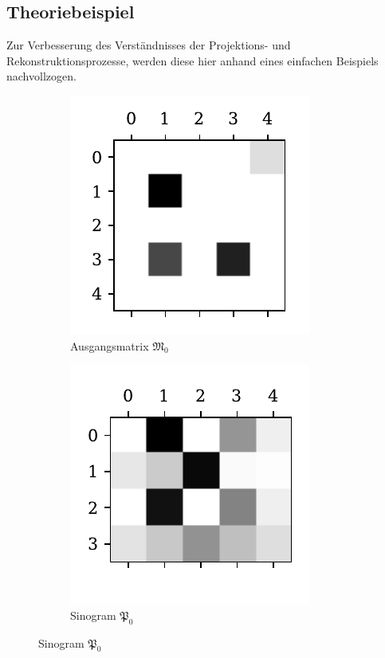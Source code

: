 \documentclass[slug=PET, room=Andreas-Schubert-Bau\,\ 424A, supervisor=Carsten\ Bittrich, coursedate=10.\ 01.\ 2020]{../../Lab_Report_LaTeX/lab_report}
\begin{document}
\subsection{Theoriebeispiel}
\label{sec:theobei}
Zur Verbesserung des Verst\"andnisses der Projektions- und
Rekonstruktionsprozesse, werden diese hier anhand eines einfachen
Beispiels nachvollzogen.

\begin{figure}[htp]
  \centering
  \begin{subfigure}[t]{.25\textwidth}
    \centering
    \includegraphics[width=.6\textwidth]{../auswertung/figs/theory/source.pdf}
    \caption{Ausgangsmatrix \(\mathfrak{M}_0\)}
    \label{fig:theory-source}
  \end{subfigure}
  \begin{subfigure}[t]{.25\textwidth}
    \centering
    \includegraphics[width=.6\textwidth]{../auswertung/figs/theory/projection.pdf}
    \caption{Sinogram \(\mathfrak{P}_0\)}
    \label{fig:theory-projection}
  \end{subfigure}

\end{figure}
\end{document}
